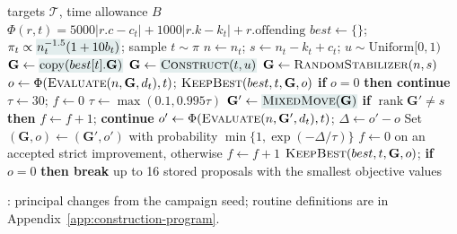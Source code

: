\begin{algorithm}[H]
\caption{Search program evolved by AlphaEvolve.}
\label{alg:search}
\small
\begin{algorithmic}[1]
\Require targets $\mathcal{T}$, time allowance $B$
\Statex $\Phi(r,t)=5000|r.c-c_t|+1000|r.k-k_t|+r.\mathrm{offending}$
\State $best\gets\{\}$; 
  \State $\pi_t\propto\algdelta{$n_t^{-1.5}(1+10b_t)$}$; sample $t\sim\pi$
  \State $n\gets n_t$; $s\gets n_t-k_t+c_t$; $u\sim\mathrm{Uniform}[0,1)$
    \State $\mathbf{G}\gets\algdelta{$\operatorname{copy}(best[t].\mathbf{G})$}$
  \Else
    \State $\mathbf{G}\gets\algdelta{$\textsc{Construct}(t,u)$}$
  \EndIf
    \State $\mathbf{G}\gets\textsc{RandomStabilizer}(n,s)$
  \EndIf
  \State $o\gets\Phi(\textsc{Evaluate}(n,\mathbf{G},d_t),t)$; $\textsc{KeepBest}(best,t,\mathbf{G},o)$
  \State \textbf{if} $o=0$ \textbf{then continue}
  \State $\tau\gets30$; $f\gets0$
    \State $\tau\gets\max(0.1,0.995\tau)$
    \State $\mathbf{G}'\gets\algdelta{$\textsc{MixedMove}(\mathbf{G})$}$
    \State \textbf{if} $\operatorname{rank}\mathbf{G}'\ne s$ \textbf{then} $f\gets f+1$; \textbf{continue}
    \State $o'\gets\Phi(\textsc{Evaluate}(n,\mathbf{G}',d_t),t)$; $\Delta\gets o'-o$
    \State Set $(\mathbf{G},o)\gets(\mathbf{G}',o')$ with probability $\min\{1,\exp(-\Delta/\tau)\}$
    \State $f\gets0$ on an accepted strict improvement, otherwise $f\gets f+1$
    \State $\textsc{KeepBest}(best,t,\mathbf{G},o)$; \textbf{if} $o=0$ \textbf{then break}
  \EndWhile
  \State {}
\EndWhile
\State \Return up to 16 stored proposals with the smallest objective values
\end{algorithmic}
\vspace{2pt}
{\footnotesize{}: principal changes from the campaign seed; routine definitions are in Appendix~\ref{app:construction-program}.}
\end{algorithm}
